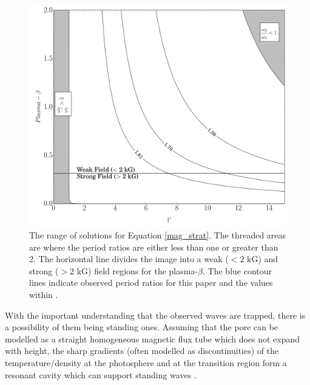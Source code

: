     \begin{figure}
        \centering
        \includegraphics[width=\textwidth]{harmonics.pdf}
        \caption{The range of solutions for Equation \ref{mag_strat}.
            The threaded areas are where the period ratios are either less than one or greater than 2.
            The horizontal line divides the image into a weak ($<2$ kG) and strong ($>2$ kG) field regions for the plasma-$\beta$.
            The blue contour lines indicate observed period ratios for this paper and the values within \cite{Dorotovic2014}.}
        \label{fig:harm}
    \end{figure}		
    
    With the important understanding that the observed waves are trapped, there is a possibility of them being standing ones.
    Assuming that the pore can be modelled as a straight homogeneous magnetic flux tube which does not expand with height, the sharp gradients (often modelled as discontinuities) of the temperature/density at the photosphere and at the transition region form a resonant cavity which can support standing waves \citep[see][]{fleck,malins}.  
    

